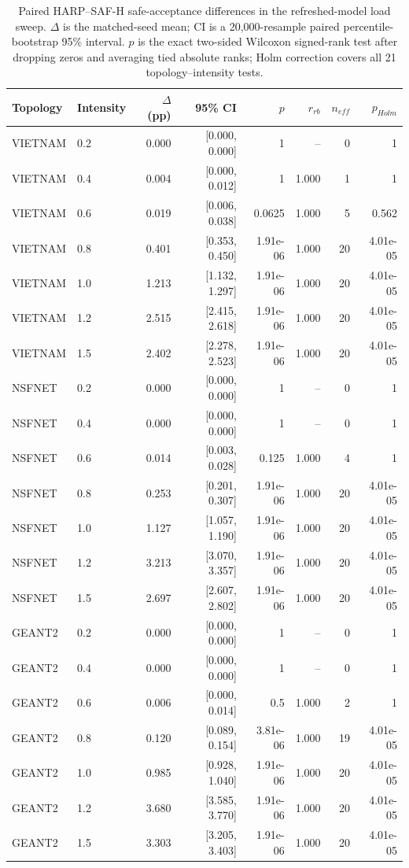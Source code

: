 \documentclass[final,5p]{elsarticle}
\begin{document}
\begin{table}[p]
\centering
\color{revisiongreen}\small
\begin{tabular}{llrrrrrr}
\toprule
Topology & Intensity & $\Delta$ (pp) & 95\% CI & $p$ & $r_{rb}$ & $n_{eff}$ & $p_{Holm}$ \\
\midrule
VIETNAM & 0.2 & 0.000 & [0.000, 0.000] & 1 & -- & 0 & 1 \\
VIETNAM & 0.4 & 0.004 & [0.000, 0.012] & 1 & 1.000 & 1 & 1 \\
VIETNAM & 0.6 & 0.019 & [0.006, 0.038] & 0.0625 & 1.000 & 5 & 0.562 \\
VIETNAM & 0.8 & 0.401 & [0.353, 0.450] & 1.91e-06 & 1.000 & 20 & 4.01e-05 \\
VIETNAM & 1.0 & 1.213 & [1.132, 1.297] & 1.91e-06 & 1.000 & 20 & 4.01e-05 \\
VIETNAM & 1.2 & 2.515 & [2.415, 2.618] & 1.91e-06 & 1.000 & 20 & 4.01e-05 \\
VIETNAM & 1.5 & 2.402 & [2.278, 2.523] & 1.91e-06 & 1.000 & 20 & 4.01e-05 \\
NSFNET & 0.2 & 0.000 & [0.000, 0.000] & 1 & -- & 0 & 1 \\
NSFNET & 0.4 & 0.000 & [0.000, 0.000] & 1 & -- & 0 & 1 \\
NSFNET & 0.6 & 0.014 & [0.003, 0.028] & 0.125 & 1.000 & 4 & 1 \\
NSFNET & 0.8 & 0.253 & [0.201, 0.307] & 1.91e-06 & 1.000 & 20 & 4.01e-05 \\
NSFNET & 1.0 & 1.127 & [1.057, 1.190] & 1.91e-06 & 1.000 & 20 & 4.01e-05 \\
NSFNET & 1.2 & 3.213 & [3.070, 3.357] & 1.91e-06 & 1.000 & 20 & 4.01e-05 \\
NSFNET & 1.5 & 2.697 & [2.607, 2.802] & 1.91e-06 & 1.000 & 20 & 4.01e-05 \\
GEANT2 & 0.2 & 0.000 & [0.000, 0.000] & 1 & -- & 0 & 1 \\
GEANT2 & 0.4 & 0.000 & [0.000, 0.000] & 1 & -- & 0 & 1 \\
GEANT2 & 0.6 & 0.006 & [0.000, 0.014] & 0.5 & 1.000 & 2 & 1 \\
GEANT2 & 0.8 & 0.120 & [0.089, 0.154] & 3.81e-06 & 1.000 & 19 & 4.01e-05 \\
GEANT2 & 1.0 & 0.985 & [0.928, 1.040] & 1.91e-06 & 1.000 & 20 & 4.01e-05 \\
GEANT2 & 1.2 & 3.680 & [3.585, 3.770] & 1.91e-06 & 1.000 & 20 & 4.01e-05 \\
GEANT2 & 1.5 & 3.303 & [3.205, 3.403] & 1.91e-06 & 1.000 & 20 & 4.01e-05 \\
\bottomrule
\end{tabular}
\caption{Paired HARP--SAF-H safe-acceptance differences in the refreshed-model load sweep. $\Delta$ is the matched-seed mean; CI is a 20,000-resample paired percentile-bootstrap 95\% interval. $p$ is the exact two-sided Wilcoxon signed-rank test after dropping zeros and averaging tied absolute ranks; Holm correction covers all 21 topology--intensity tests.}
\label{tab:load_sweep_paired_statistics}
\end{table}
\end{document}
